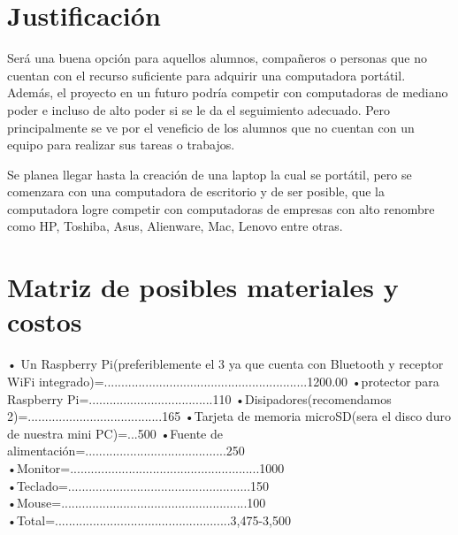 \documentclass[14pt,letterpaper]{article}
\begin{document}
\section{Justificación}
Será una buena opción para aquellos alumnos, compañeros o personas que no cuentan con el recurso suficiente para adquirir una computadora portátil. Además, el proyecto en un futuro podría competir con computadoras de mediano poder e incluso de alto poder si se le da el seguimiento adecuado. Pero principalmente se ve por el veneficio de los alumnos que no cuentan con un equipo para realizar sus tareas o trabajos.

Se planea llegar hasta la creación de una laptop la cual se portátil, pero se comenzara con una computadora de escritorio y de ser posible, que la computadora logre competir con computadoras de empresas con alto renombre como HP, Toshiba, Asus, Alienware, Mac, Lenovo entre otras.
\linebreak
\linebreak
\linebreak
\section{Matriz de posibles materiales y costos} 
    • Un Raspberry Pi(preferiblemente el 3 ya que cuenta con Bluetooth y receptor WiFi integrado)=...........................................................1200.00
    \linebreak
    •protector para Raspberry Pi=....................................110 
    \linebreak
    •Disipadores(recomendamos 2)=.......................................165
    \linebreak
    •Tarjeta de memoria microSD(sera el disco duro de nuestra mini PC)=...500
    \linebreak
    •Fuente de alimentación=.........................................250
    \linebreak
    •Monitor=.......................................................1000
    \linebreak
    •Teclado=.....................................................150
    \linebreak
    •Mouse=......................................................100
    \linebreak
    •Total=...................................................3,475-3,500
\linebreak
\linebreak
\linebreak
\end{document}
